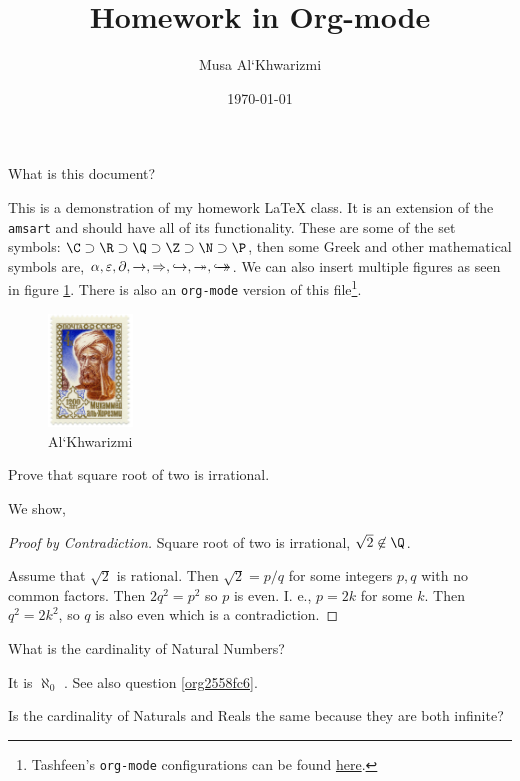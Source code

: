 \documentclass{homework}
\author{Musa Al`Khwarizmi}
\date{\today}
\title{Homework in Org-mode}
\begin{document}
\maketitle

\question What is this document?
\label{sec:org509176b}

This is a demonstration of my homework \LaTeX{} class. It is an extension of the \texttt{amsart} and should have all of its functionality. These are some of the set symbols: \(\C \supset \R \supset \Q \supset \Z \supset \N \supset \P\), then some Greek and other mathematical symbols are, \(\alpha, \varepsilon, \partial, \rightarrow, \Rightarrow, \hookrightarrow, \twoheadrightarrow, \hookrightarrow\mathrel{\mspace{-15mu}}\rightarrow\). We can also insert multiple figures as seen in figure \ref{fig:orge3a9243}. There is also an \texttt{org-mode} version of this file\footnote{Tashfeen's \texttt{org-mode} configurations can be found \href{https://github.com/simurgh9/emacs786}{here}.}.

\begin{figure}[htbp]
\centering
\includegraphics[width=0.2\textwidth]{../../media/khwarizmi.png}
\caption{\label{fig:orge3a9243}Al`Khwarizmi}
\end{figure}

\question Prove that square root of two is irrational.
\label{sec:orgaeffa5e}

We show,
\begin{proof}[Proof by Contradiction]
Square root of two is irrational, \(\sqrt{2} \not\in \Q\).

Assume that \(\sqrt{2}\) is rational. Then \(\sqrt{2} = p/q\) for some integers \(p,q\) with no common factors. Then \(2q^2 = p^2\) so \(p\) is even. I. e., \(p=2k\) for some \(k\). Then \(q^2=2k^2\), so \(q\) is also even which is a contradiction.
\end{proof}

\question What is the cardinality of Natural Numbers?
\label{sec:org2607152}
\label{org7b99575}

It is \(\aleph_0\) \cite{arlinghaus1996part}. See also question \ref{org2558fc6}.

\question [IV] Is the cardinality of Naturals and Reals the same because they are both infinite?
\label{sec:orgdcb89aa}
\label{org2558fc6}
\end{document}
